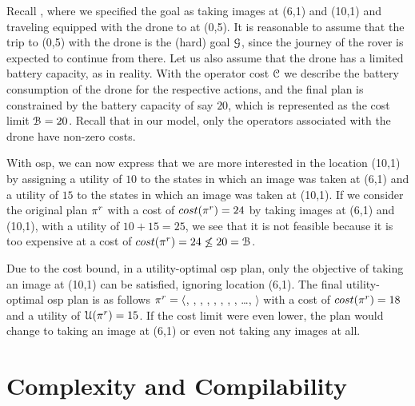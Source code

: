 \begin{example}\label{ex:osp}
    Recall , where we specified the goal as taking images at (6,1) and (10,1) and traveling equipped with the drone to  at (0,5).
    It is reasonable to assume that the trip to (0,5) with the drone is the (hard) goal $\mathcal G$, since the journey of the rover is expected to continue from there.
    Let us also assume that the drone has a limited battery capacity, as in reality.
    With the operator cost $\mathcal C$ we describe the battery consumption of the drone for the respective actions, and the final plan is constrained by the battery capacity of say $20$, which is represented as the cost limit $\mathcal B = 20$.
    Recall that in our model, only the operators associated with the drone have non-zero costs.

    With osp, we can now express that we are more interested in the location (10,1) by assigning a utility of $10$ to the states in which an image was taken at (6,1) and a utility of $15$ to the states in which an image was taken at (10,1).
    If we consider the original plan $\pi^{r{}}$ with a cost of $cost{}(\pi^r{}) = 24$ by taking images at (6,1) and (10,1), with a utility of $10+15=25$, we see that it is not feasible because it is too expensive at a cost of $cost{}(\pi^r{}) = 24 \not\leq 20 = \mathcal B$.

    Due to the cost bound, in a utility-optimal osp plan, only the objective of taking an image at (10,1) can be satisfied, ignoring location (6,1). 
    The final utility-optimal osp plan is as follows $\pi^r{} = \langle$, , , , , , , , \dots, $\rangle$ with a cost of $cost(\pi^r{}) = 18$ and a utility of $\mathcal U(\pi^r{}) = 15$. If the cost limit were even lower, the plan would change to taking an image at (6,1) or even not taking any images at all.
\end{example}

\section{Complexity and Compilability}

